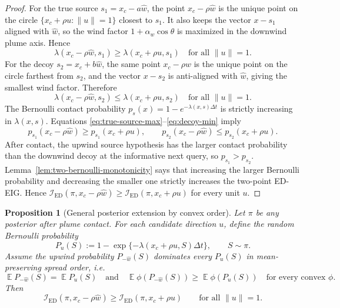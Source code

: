 \documentclass[11pt]{article}
\newtheorem{proposition}[theorem]{Proposition}
\DeclareMathOperator{\E}{\mathbb{E}}
\newcommand{\dt}{\Delta t}
\newcommand{\IED}{\mathcal{I}_{\mathrm{ED}}}
\begin{document}
\begin{proof}
For the true source $s_1=x_c-a\widehat{w}$, the point $x_c-\rho\widehat{w}$ is the unique point on the circle $\{x_c+\rho u:\|u\|=1\}$ closest to $s_1$.  It also keeps the vector $x-s_1$ aligned with $\widehat{w}$, so the wind factor $1+\alpha_w\cos\theta$ is maximized in the downwind plume axis.  Hence
\begin{equation}
        \lambda(x_c-\rho\widehat{w},s_1)
        \geq
        \lambda(x_c+\rho u,s_1)
        \quad\text{for all }\|u\|=1.
        \label{eq:true-source-max}
\end{equation}
For the decoy $s_2=x_c+b\widehat{w}$, the same point $x_c-\rho\widehat{w}$ is the unique point on the circle farthest from $s_2$, and the vector $x-s_2$ is anti-aligned with $\widehat{w}$, giving the smallest wind factor.  Therefore
\begin{equation}
        \lambda(x_c-\rho\widehat{w},s_2)
        \leq
        \lambda(x_c+\rho u,s_2)
        \quad\text{for all }\|u\|=1.
        \label{eq:decoy-min}
\end{equation}
The Bernoulli contact probability $p_s(x)=1-e^{-\lambda(x,s)\dt}$ is strictly increasing in $\lambda(x,s)$.  Equations \eqref{eq:true-source-max}--\eqref{eq:decoy-min} imply
\[
        p_{s_1}(x_c-\rho\widehat{w})
        \geq
        p_{s_1}(x_c+\rho u),
        \qquad
        p_{s_2}(x_c-\rho\widehat{w})
        \leq
        p_{s_2}(x_c+\rho u).
\]
After contact, the upwind source hypothesis has the larger contact probability than the downwind decoy at the informative next query, so $p_{s_1}>p_{s_2}$.  Lemma~\ref{lem:two-bernoulli-monotonicity} says that increasing the larger Bernoulli probability and decreasing the smaller one strictly increases the two-point ED-EIG.  Hence $\IED(\pi,x_c-\rho\widehat{w})\geq \IED(\pi,x_c+\rho u)$ for every unit $u$.
\end{proof}

\begin{proposition}[General posterior extension by convex order]\label{prop:p3-general}
Let $\pi$ be any posterior after plume contact.  For each candidate direction $u$, define the random Bernoulli probability
\[
        P_u(S):=1-\exp\{-\lambda(x_c+\rho u,S)\dt\},
        \qquad S\sim\pi .
\]
Assume the upwind probability $P_{-\widehat{w}}(S)$ dominates every $P_u(S)$ in mean-preserving spread order, i.e.
\[
        \E P_{-\widehat{w}}(S)=\E P_u(S)
        \quad\text{and}\quad
        \E\phi(P_{-\widehat{w}}(S))\geq \E\phi(P_u(S))
        \quad
        \text{for every convex }\phi .
        \label{eq:mps-order}
\]
Then
\begin{equation}
        \IED(\pi,x_c-\rho\widehat{w})
        \geq
        \IED(\pi,x_c+\rho u)
        \qquad\text{for all }\|u\|=1.
        \label{eq:general-upwind}
\end{equation}
\end{proposition}
\end{document}
